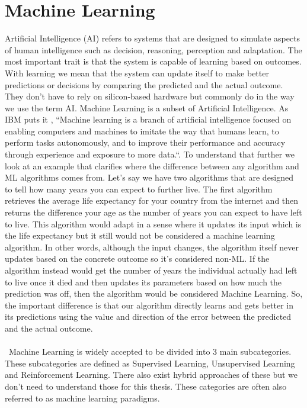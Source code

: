 \documentclass[a4paper,12pt]{report}
\begin{document}
\chapter{Machine Learning}
Artificial Intelligence (AI) refers to systems that are designed to simulate aspects of human intelligence such as decision, reasoning, perception and adaptation. The most important trait is that the system is capable of learning based on outcomes. With learning we mean that the system can update itself to make better predictions or decisions by comparing the predicted and the actual outcome. They don’t have to rely on silicon-based hardware but commonly do in the way we use the term AI. Machine Learning is a subset of Artificial Intelligence. As IBM puts it \cite{48}, “Machine learning is a branch of artificial intelligence focused on enabling computers and machines to imitate the way that humans learn, to perform tasks autonomously, and to improve their performance and accuracy through experience and exposure to more data.“. To understand that further we look at an example that clarifies where the difference between any algorithm and ML algorithms comes from. Let’s say we have two algorithms that are designed to tell how many years you can expect to further live. The first algorithm retrieves the average life expectancy for your country from the internet and then returns the difference your age as the number of years you can expect to have left to live. This algorithm would adapt in a sense where it updates its input which is the life expectancy but it still would not be considered a machine learning algorithm. In other words, although the input changes, the algorithm itself never updates based on the concrete outcome so it's considered non-ML. If the algorithm instead would get the number of years the individual actually had left to live once it died and then updates its parameters based on how much the prediction was off, then the algorithm would be considered Machine Learning. So, the important difference is that our algorithm directly learns and gets better in its predictions using the value and direction of the error between the predicted and the actual outcome.\\
\\\	
Machine Learning is widely accepted to be divided into 3 main subcategories. These subcategories are defined as Supervised Learning, Unsupervised Learning and Reinforcement Learning. There also exist hybrid approaches of these but we don't need to understand those for this thesis. These categories are often also referred to as machine learning paradigms. 
\end{document}
